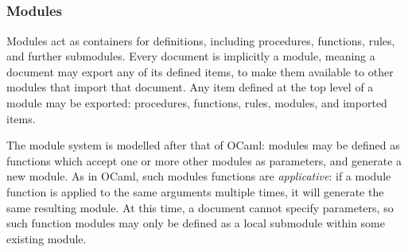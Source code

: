 \begin{bnf}
     \\
     \\
     \\
     \\
     \\
     \\
     \\
     \\
     \\
\end{bnf}

\subsubsection{Modules}

Modules act as containers for definitions, including procedures,
functions, rules, and further submodules. Every \Trilogy{} document is
implicitly a module, meaning a document may export any of its defined items,
to make them available to other modules that import that document. Any item
defined at the top level of a module may be exported: procedures, functions,
rules, modules, and imported items.

The \Trilogy{} module system is modelled after that of OCaml: modules may
be defined as functions which accept one or more other modules as parameters,
and generate a new module. As in OCaml, such modules functions are \emph{applicative}:
if a module function is applied to the same arguments multiple times, it will
generate the same resulting module. At this time, a document cannot specify
parameters, so such function modules may only be defined as a local submodule
within some existing module.

